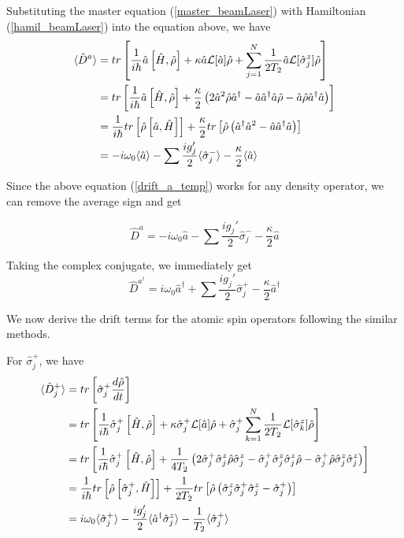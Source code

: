 \documentclass{article}
\newcommand{\lindblad}{\mathcal{L}}
\newcommand{\szj}{\hat{\sigma}^z_j}
\newcommand{\spj}{\hat{\sigma}^+_j}
\newcommand{\smj}{\hat{\sigma}^-_j}
\begin{document}
Substituting the master equation (\ref{master_beamLaser}) with Hamiltonian (\ref{hamil_beamLaser}) into the equation above, we have
\begin{align}
\label{drift_a_temp}
    \notag \langle \hat{D}^a \rangle &= tr\left[\frac{1}{i\hbar}\Hat{a}\left[\Hat{H}, \Hat{\rho}\right]+\kappa\Hat{a}\lindblad[\hat{a}]\hat{\rho}+\sum^{N}_{j=1}\frac{1}{2T_2}\Hat{a}\lindblad[\hat{\sigma}^z_j]\hat{\rho}\right]\\
    \notag &= tr\left[\frac{1}{i\hbar}\Hat{a}\left[\Hat{H}, \Hat{\rho}\right]+\frac{\kappa}{2}\left(2\Hat{a}^2\Hat{\rho}\Hat{a}^\dagger-\Hat{a}\hat{a}^\dagger\Hat{a}\Hat{\rho}-\Hat{a}\Hat{\rho}\Hat{a}^\dagger\Hat{a}\right)\right]\\
    \notag &= \frac{1}{i\hbar}tr\left[\Hat{\rho}\left[\Hat{a}, \Hat{H}\right]\right]+\frac{\kappa}{2}tr\left[\hat{\rho}\left(\Hat{a}^\dagger\hat{a}^2-\Hat{a}\hat{a}^\dagger\Hat{a}\right)\right]\\
    &= -i\omega_0 \langle \hat{a} \rangle-\sum\frac{ig_j'}{2}\langle \smj \rangle - \frac{\kappa}{2}\langle \hat{a} \rangle
\end{align}

Since the above equation (\ref{drift_a_temp}) works for any density operator, we can remove the average sign and get

\begin{equation}
\label{qle_a_drift}
    \hat{D}^a = -i\omega_0 \hat{a}-\sum\frac{ig_j'}{2} \smj  - \frac{\kappa}{2} \hat{a}
\end{equation}

Taking the complex conjugate, we immediately get
\begin{equation}
\label{qle_aDag_drift}
    \hat{D}^{a^\dagger} = i\omega_0 \hat{a}^\dagger+\sum\frac{ig_j'}{2} \spj  - \frac{\kappa}{2} \hat{a}^\dagger
\end{equation}

We now derive the drift terms for the atomic spin operators following the similar methods.

For $\spj$, we have
\begin{align}
    \notag\langle \Hat{D}^+_j \rangle &= tr\left[\spj \frac{d\hat{\rho}}{dt}\right]\\
    \notag &= tr\left[\frac{1}{i\hbar}\spj \left[\Hat{H}, \Hat{\rho}\right]+\kappa\spj\lindblad[\hat{a}]\hat{\rho}+\spj\sum^{N}_{k=1}\frac{1}{2T_2}\lindblad[\hat{\sigma}^z_k]\hat{\rho}\right]\\
    \notag &= tr\left[\frac{1}{i\hbar}\spj\left[\Hat{H}, \Hat{\rho}\right]+\frac{1}{4T_2}\left(2\spj\hat{\sigma}^z_j\Hat{\rho}\hat{\sigma}^z_j-\spj\hat{\sigma}^z_j\hat{\sigma}^z_j\Hat{\rho}-\spj\Hat{\rho}\hat{\sigma}^z_j\hat{\sigma}^z_j\right)\right]\\
    \notag &= \frac{1}{i\hbar}tr\left[\Hat{\rho}\left[\spj, \Hat{H}\right]\right]+\frac{1}{2T_2}tr\left[\hat{\rho}\left(\szj\spj\szj-\spj\right)\right]\\
    &= i\omega_0 \langle \spj \rangle-\frac{ig_j'}{2}\langle \hat{a}^\dagger \szj \rangle - \frac{1}{T_2}\langle \spj \rangle
\end{align}
\end{document}
